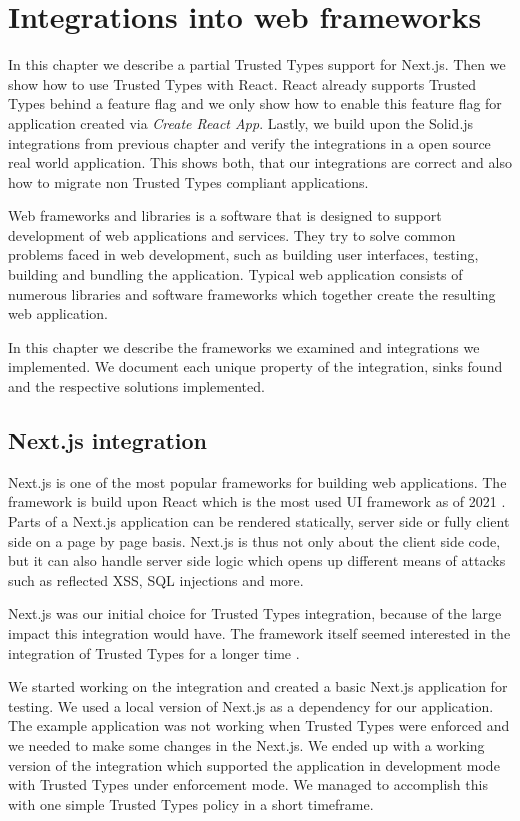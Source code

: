 \chapter{Integrations into web frameworks}

In this chapter we describe a partial Trusted Types support for Next.js. Then we show how to use
Trusted Types with React. React already supports Trusted Types behind a feature flag and we only
show how to enable this feature flag for application created via \emph{Create React App}. Lastly, we
build upon the Solid.js integrations from previous chapter and verify the integrations in a open
source real world application. This shows both, that our integrations are correct and also how to
migrate non Trusted Types compliant applications.

Web frameworks and libraries is a software that is designed to support development of web
applications and services. They try to solve common problems faced in web development, such as
building user interfaces, testing, building and bundling the application. Typical web application
consists of numerous libraries and software frameworks which together create the resulting web
application.

In this chapter we describe the frameworks we examined and integrations we implemented. We document
each unique property of the integration, sinks found and the respective solutions implemented.

\section{Next.js integration}
\label{intro-nextjs}

Next.js is one of the most popular frameworks for building web applications. The framework is build
upon React which is the most used UI framework as of 2021 \cite{react_most_used_2021}. Parts of a
Next.js application can be rendered statically, server side or fully client side on a page by page
basis. Next.js is thus not only about the client side code, but it can also handle server side logic
which opens up different means of attacks such as reflected XSS, SQL injections and more.

Next.js was our initial choice for Trusted Types integration, because of the large impact this
integration would have. The framework itself seemed interested in the integration of Trusted Types
for a longer time \cite{nextjs_tt_pr_2020}.

We started working on the integration and created a basic Next.js application for testing. We used a
local version of Next.js as a dependency for our application. The example application was not
working when Trusted Types were enforced and we needed to make some changes in the Next.js. We ended
up with a working version of the integration which supported the application in development mode
with Trusted Types under enforcement mode. We managed to accomplish this with one simple Trusted
Types policy in a short timeframe.


